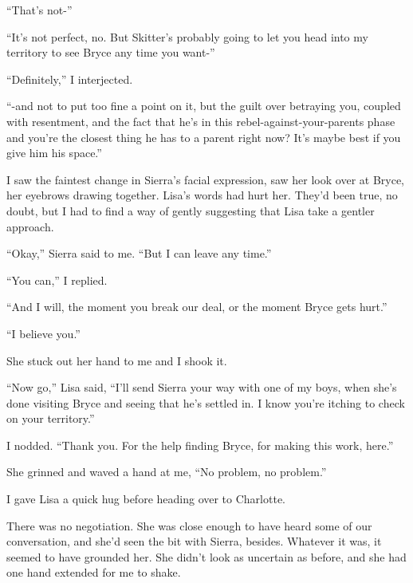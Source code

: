 ``That's not-''



``It's not perfect, no.  But Skitter's probably going to let you head into my territory to see Bryce any time you want-''



``Definitely,'' I interjected.



``-and not to put too fine a point on it, but the guilt over betraying you, coupled with resentment, and the fact that he's in this rebel-against-your-parents phase and you're the closest thing he has to a parent right now? It's maybe best if you give him his space.''



I saw the faintest change in Sierra's facial expression, saw her look over at Bryce, her eyebrows drawing together.  Lisa's words had hurt her.  They'd been true, no doubt, but I had to find a way of gently suggesting that Lisa take a gentler approach.



``Okay,'' Sierra said to me.  ``But I can leave any time.''



``You can,'' I replied.



``And I will, the moment you break our deal, or the moment Bryce gets hurt.''



``I believe you.''



She stuck out her hand to me and I shook it.



``Now go,'' Lisa said, ``I'll send Sierra your way with one of my boys, when she's done visiting Bryce and seeing that he's settled in.  I know you're itching to check on your territory.''



I nodded.  ``Thank you.  For the help finding Bryce, for making this work, here.''



She grinned and waved a hand at me, ``No problem, no problem.''



I gave Lisa a quick hug before heading over to Charlotte.



There was no negotiation.  She was close enough to have heard some of our conversation, and she'd seen the bit with Sierra, besides.  Whatever it was, it seemed to have grounded her.  She didn't look as uncertain as before, and she had one hand extended for me to shake.



